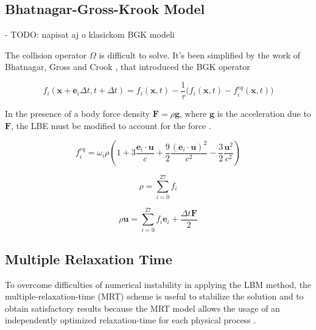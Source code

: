 \subsection{Bhatnagar-Gross-Krook Model}


- TODO: napisat aj o klasickom BGK modeli \citep{bgk1954}

The collision operator $\Omega$ is difficult to solve. It's been simplified by the work of Bhatnagar, Gross and Crook \cite{bhatnagarModelCollisionProcesses1954}, that introduced the BGK operator

\begin{equation}
	\label{eq:std-bgk}
	f_i (\bm{x}+\bm{e}_i\Delta t,t+\Delta t) = f_i (\bm{x},t)-\frac{1}{\tau}\Big(f_i (\bm{x},t) - f_i^{eq} (\bm{x},t)\Big)
\end{equation}

In the presence of a body force density $\bm{F} = \rho \bm{g}$, where $\bm{g}$ is
the acceleration due to $\bm{F}$, the LBE must be modified to account for the force \cite{guoDiscreteLatticeEffects2002}.

\begin{equation}
	\label{eq:feq}
	f_i^{eq} = \omega_i \rho \left( 1+3\frac{\bm{e}_i \cdot \bm{u}}{c} + \frac{9}{2}\frac{(\bm{e}_i \cdot \bm{u})^2}{c^2}-\frac{3}{2}\frac{\bm{u}^2}{c^2}\right)
\end{equation}

\begin{equation}
	\label{eq:density}
	\rho = \sum_{i=0}^{27}f_i
\end{equation}

\begin{equation}
	\label{eq:velocity}
	\rho\bm{u} = \sum_{i=0}^{27} f_i \bm{e}_i + \frac{\Delta t \bm{F}}{2}
\end{equation}

\subsection{Multiple Relaxation Time}

To overcome difficulties of numerical instability in applying the LBM method, the multiple-relaxation-time (MRT) scheme is useful to stabilize the solution and to obtain satisfactory results because the MRT model allows the usage of an independently optimized relaxation-time for each physical process \cite{sugaD3Q27MultiplerelaxationtimeLattice2015}.

